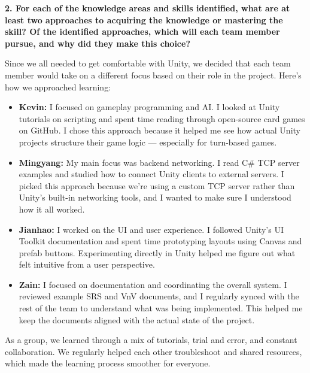 \documentclass[12pt]{article}
\begin{document}
\textbf{2. For each of the knowledge areas and skills identified, what are at least two approaches to acquiring the knowledge or mastering the skill? Of the identified approaches, which will each team member pursue, and why did they make this choice?}

Since we all needed to get comfortable with Unity, we decided that each team member would take on a different focus based on their role in the project. Here's how we approached learning:

\begin{itemize}
    \item \textbf{Kevin:} I focused on gameplay programming and AI. I looked at Unity tutorials on scripting and spent time reading through open-source card games on GitHub. I chose this approach because it helped me see how actual Unity projects structure their game logic — especially for turn-based games.

    \item \textbf{Mingyang:} My main focus was backend networking. I read C# TCP server examples and studied how to connect Unity clients to external servers. I picked this approach because we’re using a custom TCP server rather than Unity's built-in networking tools, and I wanted to make sure I understood how it all worked.

    \item \textbf{Jianhao:} I worked on the UI and user experience. I followed Unity's UI Toolkit documentation and spent time prototyping layouts using Canvas and prefab buttons. Experimenting directly in Unity helped me figure out what felt intuitive from a user perspective.

    \item \textbf{Zain:} I focused on documentation and coordinating the overall system. I reviewed example SRS and VnV documents, and I regularly synced with the rest of the team to understand what was being implemented. This helped me keep the documents aligned with the actual state of the project.
\end{itemize}

As a group, we learned through a mix of tutorials, trial and error, and constant collaboration. We regularly helped each other troubleshoot and shared resources, which made the learning process smoother for everyone.
\end{document}

